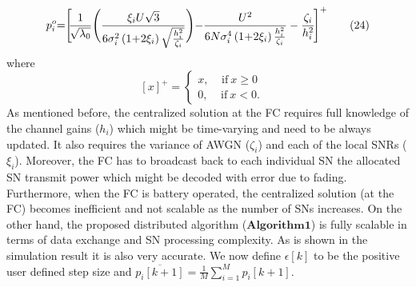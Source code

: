 \documentclass[conference]{IEEEtran}
\begin{document}
\begin{align*}\label{eq24}
p^o_{i}\hspace{-0.1cm}=\hspace{-0.1cm}\Biggl[\hspace{-0.1cm}\frac{1}{\sqrt{\lambda_0}}\Biggl(\frac{\xi_i U\sqrt{3}}{6\sigma_i^{2}\left(1\hspace{-0.07cm}+\hspace{-0.07cm}2\xi_i\right)\sqrt{\frac{h_i^{2}}{\zeta_i}}}\Biggl)- \frac{U^2}{6N\sigma_i^{4}\left(1\hspace{-0.07cm}+\hspace{-0.07cm}2\xi_i\right)\frac{h_i^{2}}{\zeta_i}} -\frac{\zeta_i}{h_i^{2}}\hspace{-0.05cm}\Biggr]^{+} 
\tag{24}
\end{align*}
where
\begin{equation*}\label{eq2254}
[x]^+=\left\{
\begin{aligned}
 x, \ \ \ \  \ \mathrm{ if} \ x\geq0 \ \quad \\
  0, \ \ \ \  \ \mathrm{ if} \ x<0 .\quad \end{aligned}
\right. 
\end{equation*}
As mentioned before, the centralized solution at the FC requires full knowledge of the channel gains ($h_i$) which might be time-varying and need to be  always updated. It also requires the variance of AWGN ($\zeta_i$) and each of the local SNRs ($\xi_i$). Moreover, the FC has to broadcast back to each individual SN the allocated SN transmit power which might be decoded with error due to fading. Furthermore, when the FC is battery operated, the centralized solution (at the FC) becomes inefficient and not scalable as the number of SNs increases. On the other hand, the proposed distributed algorithm ($\boldsymbol {Algorithm1}$) is fully scalable in terms of data exchange and SN processing complexity. As is shown in the simulation result it is also very accurate.
We now define $\epsilon[k]$ to be the positive user defined step size and $\overline{p_i\left[k+1\right]}=\frac{1}{M}\sum \limits_{i=1}^M p_i\left[k+1\right]$.
\end{document}
